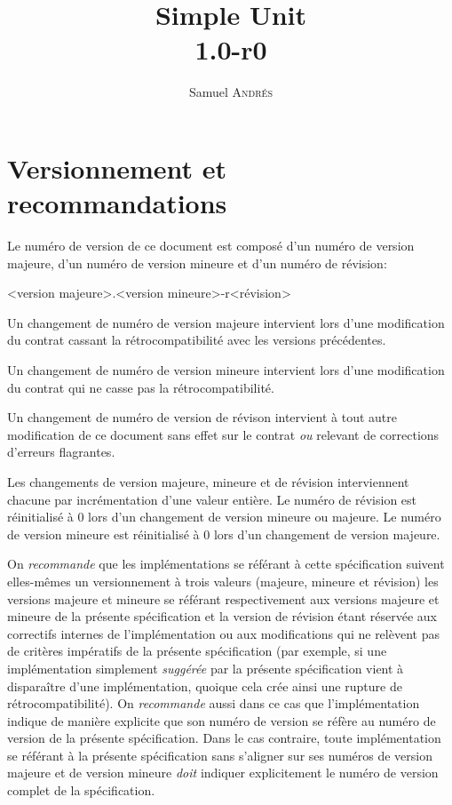 \documentclass[a4paper,twoside,10pt]{article}
\title{Simple Unit\\1.0-r0}
\author{Samuel \textsc{Andrés}}
\begin{document}
\maketitle

\section{Versionnement et recommandations}

Le numéro de version de ce document est composé d'un numéro de version majeure, d'un numéro de version mineure et d'un
numéro de révision:

<version majeure>.<version mineure>-r<révision>

Un changement de numéro de version majeure intervient lors d'une modification du contrat cassant la rétrocompatibilité
avec les versions précédentes.

Un changement de numéro de version mineure intervient lors d'une modification du contrat qui ne casse pas la
rétrocompatibilité.

Un changement de numéro de version de révison intervient à tout autre modification de ce document sans effet sur le
contrat \emph{ou} relevant de corrections d'erreurs flagrantes.

Les changements de version majeure, mineure et de révision interviennent chacune par incrémentation d'une valeur
entière. Le numéro de révision est réinitialisé à 0 lors d'un changement de version mineure ou majeure. Le numéro de
version mineure est réinitialisé à 0 lors d'un changement de version majeure.

On \emph{recommande} que les implémentations se référant à cette spécification suivent elles-mêmes un versionnement à
trois valeurs (majeure, mineure et révision) les versions majeure et mineure se référant respectivement aux versions
majeure et mineure de la présente spécification et la version de révision étant réservée aux correctifs internes de
l'implémentation ou aux modifications qui ne relèvent pas de critères impératifs de la présente spécification (par
exemple, si une implémentation simplement \emph{suggérée} par la présente spécification vient à disparaître d'une
implémentation, quoique cela crée ainsi une rupture de rétrocompatibilité). On \emph{recommande} aussi dans ce cas que
l'implémentation indique de manière explicite que son numéro de version se réfère au numéro de version de la présente
spécification. Dans le cas contraire, toute implémentation se référant à la présente spécification sans s'aligner sur
ses numéros de version majeure et de version mineure \emph{doit} indiquer explicitement le numéro de version complet de
la spécification.
\end{document}
